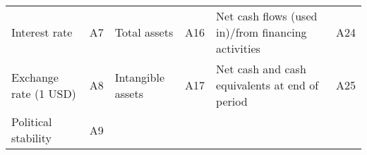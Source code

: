 \documentclass[
  11pt,
]{article}
\begin{document}
\begin{longtable}[]{@{}llllll@{}}
\begin{minipage}[t]{0.16\columnwidth}\raggedright
Interest rate\strut
\end{minipage} & \begin{minipage}[t]{0.09\columnwidth}\raggedright
A7\strut
\end{minipage} & \begin{minipage}[t]{0.19\columnwidth}\raggedright
Total assets\strut
\end{minipage} & \begin{minipage}[t]{0.09\columnwidth}\raggedright
A16\strut
\end{minipage} & \begin{minipage}[t]{0.21\columnwidth}\raggedright
Net cash flows (used in)/from financing activities\strut
\end{minipage} & \begin{minipage}[t]{0.09\columnwidth}\raggedright
A24\strut
\end{minipage}\tabularnewline
\begin{minipage}[t]{0.16\columnwidth}\raggedright
Exchange rate (1 USD)\strut
\end{minipage} & \begin{minipage}[t]{0.09\columnwidth}\raggedright
A8\strut
\end{minipage} & \begin{minipage}[t]{0.19\columnwidth}\raggedright
Intangible assets\strut
\end{minipage} & \begin{minipage}[t]{0.09\columnwidth}\raggedright
A17\strut
\end{minipage} & \begin{minipage}[t]{0.21\columnwidth}\raggedright
Net cash and cash equivalents at end of period\strut
\end{minipage} & \begin{minipage}[t]{0.09\columnwidth}\raggedright
A25\strut
\end{minipage}\tabularnewline
\begin{minipage}[t]{0.16\columnwidth}\raggedright
Political stability\strut
\end{minipage} & \begin{minipage}[t]{0.09\columnwidth}\raggedright
A9\strut
\end{minipage} & \begin{minipage}[t]{0.19\columnwidth}\raggedright
\strut
\end{minipage} & \begin{minipage}[t]{0.09\columnwidth}\raggedright
\strut
\end{minipage} & \begin{minipage}[t]{0.21\columnwidth}\raggedright
\strut
\end{minipage} & \begin{minipage}[t]{0.09\columnwidth}\raggedright
\strut
\end{minipage}\tabularnewline
\bottomrule
\end{longtable}
\end{document}
